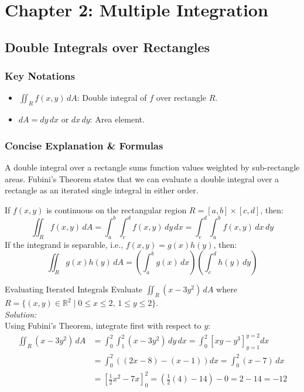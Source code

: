 \documentclass[11pt]{article}
\begin{document}
\newpage

\section{Chapter 2: Multiple Integration}

\subsection{Double Integrals over Rectangles}
\subsubsection*{Key Notations}
\begin{itemize}
    \item $\iint_R f(x,y)\,dA$: Double integral of $f$ over rectangle $R$.
    \item $dA = dy\,dx$ or $dx\,dy$: Area element.
\end{itemize}

\subsubsection*{Concise Explanation \& Formulas}
A double integral over a rectangle sums function values weighted by sub-rectangle areas. Fubini's Theorem states that we can evaluate a double integral over a rectangle as an iterated single integral in either order.
\begin{theorembox}[title={Fubini's Theorem for Rectangles}]
    If $f(x,y)$ is continuous on the rectangular region $R = [a,b] \times [c,d]$, then:
    \[ \iint_R f(x,y)\,dA = \int_a^b \int_c^d f(x,y)\,dy\,dx = \int_c^d \int_a^b f(x,y)\,dx\,dy \]
    If the integrand is separable, i.e., $f(x,y) = g(x)h(y)$, then:
    \[ \iint_R g(x)h(y)\,dA = \left( \int_a^b g(x)\,dx \right) \left( \int_c^d h(y)\,dy \right) \]
\end{theorembox}

\begin{examplebox}{Evaluating Iterated Integrals}
    Evaluate $\iint_R (x - 3y^2)\,dA$ where $R = \{(x,y) \in \mathbb{R}^2 \mid 0 \le x \le 2, \, 1 \le y \le 2\}$.\\
    \textit{Solution:}\\
    Using Fubini's Theorem, integrate first with respect to $y$:
    \begin{align*}
        \iint_R (x - 3y^2)\,dA &= \int_0^2 \int_1^2 (x - 3y^2)\,dy\,dx = \int_0^2 \left[ xy - y^3 \right]_{y=1}^{y=2} dx \\
        &= \int_0^2 \left( (2x - 8) - (x - 1) \right) dx = \int_0^2 (x - 7)\,dx \\
        &= \left[ \frac{1}{2}x^2 - 7x \right]_0^2 = \left(\frac{1}{2}(4) - 14\right) - 0 = 2 - 14 = -12
    \end{align*}
\end{examplebox}
\end{document}
